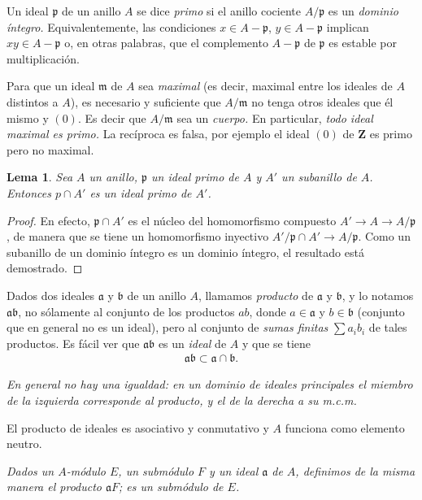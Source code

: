 \documentclass[10pt,oneside,bibtotoc,smallheadings,leqno,a5paper,DIV=12]{scrbook}
\newcommand{\ZZ}{\mathbf{Z}}
\newcommand{\idl}[1]{\mathfrak{#1}}
\renewcommand{\to}[1][]{\xrightarrow{#1}}
\numberwithin{equation}{section}
\newenvironment{comm}%
	{\begin{trivlist}\item\small\itshape}
	{\end{trivlist}}
\theoremstyle{defi}
\theoremstyle{enonce}
\newtheorem{lemma}{Lema}
\theoremstyle{rem}
\numberwithin{theorem}{section}
\numberwithin{proposition}{section}
\numberwithin{definition}{section}
\numberwithin{lemma}{section}
\numberwithin{corollary}{section}
\numberwithin{example}{section}
\numberwithin{footnote}{section}%
\begin{document}
Un ideal $\idl{p}$ de un anillo $A$ se dice {\em primo} si el anillo cociente $A/\idl{p}$
es un {\em dominio \'integro.} Equivalentemente, las condiciones $x\in A-\idl{p}$,
$y\in A-\idl{p}$ implican $xy\in A-\idl{p}$ o, en otras palabras, que el complemento
$A-\idl{p}$ de $\idl{p}$ es estable por multiplicaci\'on.

Para que un ideal $\idl{m}$ de $A$ sea {\em maximal} (es decir, maximal entre los ideales de
$A$ distintos a $A$), es necesario y suficiente que $A/\idl{m}$ no tenga otros ideales que \'el mismo
y $(0)$. Es decir que $A/\idl{m}$ sea un {\em cuerpo.}  En particular,
{\em todo ideal maximal es primo.} La rec\'iproca es falsa, por ejemplo el ideal $(0)$ de $\ZZ$
es primo pero no maximal.

\begin{lemma}\label{lem3.3.1}
Sea $A$ un anillo, $\idl{p}$ un ideal primo de $A$ y $A'$ un subanillo de $A$. Entonces
$p\cap A'$ es un ideal primo de $A'$.
\end{lemma}

\begin{proof}
En efecto, $\idl{p}\cap A'$ es el n\'ucleo del homomorfismo compuesto $A'\to A\to A/\idl{p}$,
de manera que se tiene un homomorfismo inyectivo $A'/\idl{p}\cap A'\to A/\idl{p}$. Como un
subanillo de un dominio \'integro es un dominio \'integro, el resultado est\'a demostrado.
\end{proof}

Dados dos ideales $\idl{a}$ y $\idl{b}$ de un anillo $A$, llamamos {\em producto} de $\idl{a}$
y $\idl{b}$, y lo notamos $\idl{a}\idl{b}$, no s\'olamente al conjunto de los productos
$ab$, donde $a\in\idl{a}$ y $b\in\idl{b}$ (conjunto que en general no es un ideal), pero al
conjunto de {\em sumas finitas} $\sum a_{i}b_{i}$ de tales productos. Es f\'acil ver que
$\idl{a}\idl{b}$ es un {\em ideal} de $A$ y que se tiene
\begin{gather*}
\idl{a}\idl{b}\subset\idl{a}\cap\idl{b}.
\end{gather*}

\begin{comm}
En general no hay una igualdad: en un dominio de ideales principales el miembro de la izquierda
corresponde al producto, y el de la derecha a su m.c.m.
\end{comm}
El producto de ideales es asociativo y conmutativo y $A$ funciona como elemento neutro.

\begin{comm}
Dados un $A$-m\'odulo $E$, un subm\'odulo $F$ y un ideal $\idl{a}$ de $A$, definimos
de la misma manera el producto $\idl{a}F$; es un subm\'odulo de $E$.
\end{comm}
\end{document}
